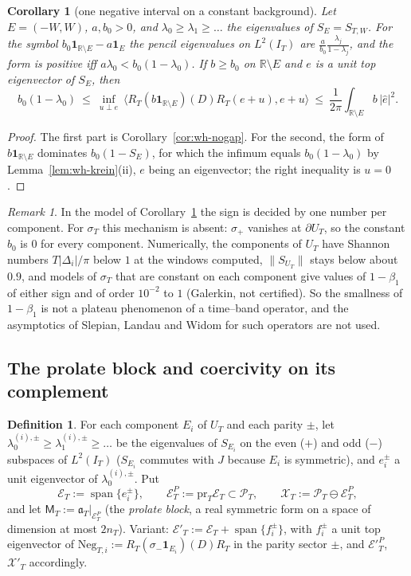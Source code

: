 \documentclass[11pt]{amsart}
\newtheorem{corollary}[theorem]{Corollary}
\theoremstyle{definition}
\newtheorem{definition}[theorem]{Definition}
\theoremstyle{remark}
\newtheorem{remark}[theorem]{Remark}
\newcommand{\R}{\mathbb R}
\newcommand{\PT}{\mathcal P_T}
\newcommand{\IT}{I_T}
\newcommand{\sT}{\sigma_T}
\begin{document}
\begin{corollary}[one negative interval on a constant background]\label{cor:wh-step}
Let $E=(-W,W)$, $a,b_0>0$, and $\lambda_0\ge\lambda_1\ge\dots$ the eigenvalues of $S_E=S_{T,W}$. For the symbol
$b_0\mathbf 1_{\R\setminus E}-a\mathbf 1_E$ the pencil eigenvalues on $L^2(\IT)$ are $\frac a{b_0}\frac{\lambda_j}{1-\lambda_j}$, and
the form is positive iff $a\lambda_0<b_0(1-\lambda_0)$. If $b\ge b_0$ on $\R\setminus E$ and $e$ is a unit top
eigenvector of $S_E$, then
\[
b_0(1-\lambda_0)\ \le\ \inf_{u\perp e}\ \langle R_T(b\mathbf 1_{\R\setminus E})(D)R_T(e+u),e+u\rangle\ \le\ \frac1{2\pi}\int_{\R\setminus E}b\,|\widehat e|^2 .
\]
\end{corollary}

\begin{proof}
The first part is Corollary~\ref{cor:wh-nogap}. For the second, the form of $b\mathbf 1_{\R\setminus E}$ dominates
$b_0(1-S_E)$, for which the infimum equals $b_0(1-\lambda_0)$ by Lemma~\ref{lem:wh-krein}(ii), $e$ being an
eigenvector; the right inequality is $u=0$.
\end{proof}

\begin{remark}\label{rem:wh-model}
In the model of Corollary~\ref{cor:wh-step} the sign is decided by one number per component. For $\sT$ this
mechanism is absent: $\sigma_+$ vanishes at $\partial U_T$, so the constant $b_0$ is $0$ for every component.
Numerically, the components of $U_T$ have Shannon numbers $T|\Delta_i|/\pi$ below $1$ at the windows
computed, $\|S_{U_T}\|$ stays below about $0.9$, and models of $\sT$ that are constant on each component give
values of $1-\beta_1$ of either sign and of order $10^{-2}$ to $1$ (Galerkin, not certified). So the smallness of
$1-\beta_1$ is not a plateau phenomenon of a time--band operator, and the asymptotics of Slepian, Landau and
Widom for such operators are not used.
\end{remark}

\subsection{The prolate block and coercivity on its complement}\label{subsec:wh-prolate}

\begin{definition}\label{def:wh-V}
For each component $E_i$ of $U_T$ and each parity $\pm$, let $\lambda^{(i),\pm}_0\ge\lambda^{(i),\pm}_1\ge\dots$ be
the eigenvalues of $S_{E_i}$ on the even ($+$) and odd ($-$) subspaces of $L^2(\IT)$ ($S_{E_i}$ commutes with $J$
because $E_i$ is symmetric), and $e^\pm_i$ a unit eigenvector of $\lambda^{(i),\pm}_0$. Put
\[
\mathcal E_T:=\operatorname{span}\{e^\pm_i\},\qquad \mathcal E^P_T:=\mathrm{pr}_T\mathcal E_T\subset\PT,\qquad
\mathcal X_T:=\PT\ominus\mathcal E^P_T ,
\]
and let $\mathsf M_T:=\mathfrak a_T|_{\mathcal E^P_T}$ (the \emph{prolate block}, a real symmetric form on a space of
dimension at most $2n_T$). Variant: $\mathcal E'_T:=\mathcal E_T+\operatorname{span}\{f^\pm_i\}$, with $f^\pm_i$ a unit top
eigenvector of $\mathrm{Neg}_{T,i}:=R_T(\sigma_-\mathbf 1_{E_i})(D)R_T$ in the parity sector $\pm$, and
$\mathcal E'^P_T$, $\mathcal X'_T$ accordingly.
\end{definition}
\end{document}
